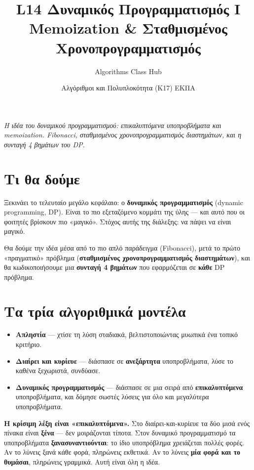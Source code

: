 \documentclass[11pt,a4paper]{article}
\title{\textbf{L14 \textperiodcentered{} Δυναμικός Προγραμματισμός I}\\[2pt]
\large Memoization \& Σταθμισμένος Χρονοπρογραμματισμός}
\author{Algorithms Class Hub}
\date{\small Αλγόριθμοι και Πολυπλοκότητα (K17) \textperiodcentered{} ΕΚΠΑ}
\begin{document}
\maketitle

\begin{center}\itshape\small
Η ιδέα του δυναμικού προγραμματισμού: επικαλυπτόμενα υποπροβλήματα και
memoization. Fibonacci, σταθμισμένος χρονοπρογραμματισμός διαστημάτων, και η
συνταγή 4 βημάτων του DP.
\end{center}

\section{Τι θα δούμε}

Ξεκινάει το τελευταίο μεγάλο κεφάλαιο: ο \textbf{δυναμικός προγραμματισμός}
(dynamic programming, DP). Είναι το πιο εξεταζόμενο κομμάτι της ύλης --- και αυτό
που οι φοιτητές βρίσκουν πιο «μαγικό». Στόχος αυτής της διάλεξης: να πάψει να
είναι μαγικό.

Θα δούμε την ιδέα μέσα από το πιο απλό παράδειγμα (Fibonacci), μετά το πρώτο
«πραγματικό» πρόβλημα (\textbf{σταθμισμένος χρονοπρογραμματισμός διαστημάτων}),
και θα κωδικοποιήσουμε μια \textbf{συνταγή 4 βημάτων} που εφαρμόζεται σε
\textbf{κάθε} DP πρόβλημα.

\section{Τα τρία αλγοριθμικά μοντέλα}

\begin{keypoint}
\begin{itemize}
  \item \textbf{Απληστία} --- χτίσε τη λύση σταδιακά, βελτιστοποιώντας μυωπικά
  ένα τοπικό κριτήριο.
  \item \textbf{Διαίρει και κυρίευε} --- διάσπασε σε \textbf{ανεξάρτητα}
  υποπροβλήματα, λύσε το καθένα ξεχωριστά, συνδύασε.
  \item \textbf{Δυναμικός προγραμματισμός} --- διάσπασε σε μια σειρά από
  \textbf{επικαλυπτόμενα} υποπροβλήματα, και δόμησε σωστές λύσεις για όλο και
  μεγαλύτερα υποπροβλήματα.
\end{itemize}
\end{keypoint}

\begin{intuition}
\textbf{Η κρίσιμη λέξη είναι «επικαλυπτόμενα».} Στο διαίρει-και-κυρίευε τα δύο
μισά ενός πίνακα είναι \textbf{ξένα} --- δεν μοιράζονται τίποτα. Στον δυναμικό
προγραμματισμό τα υποπροβλήματα \textbf{ξανασυναντιούνται}: το ίδιο υποπρόβλημα
χρειάζεται πολλές φορές. Αν το λύνεις ξανά κάθε φορά, πληρώνεις εκθετικά. Αν το
λύνεις \textbf{μία φορά και το θυμάσαι}, πληρώνεις γραμμικά. Αυτή είναι όλη η
ιδέα.
\end{intuition}
\end{document}
